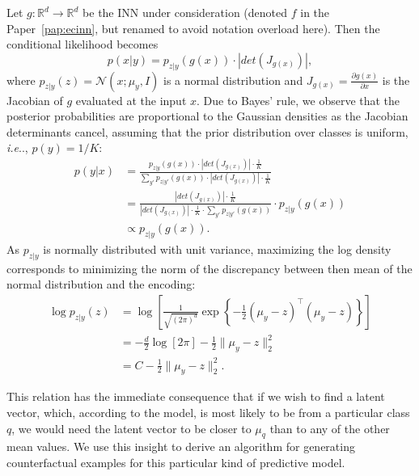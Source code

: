 \documentclass[11pt,a4paper,twoside,openright,final]{memoir}
\makeatletter
\DeclareRobustCommand\onedot{\futurelet\@let@token\@onedot}
\def\@onedot{\ifx\@let@token.\else.\null\fi\xspace}
\def\ie{\emph{i.e}\onedot} \def\Ie{\emph{I.e}\onedot}
\newcommand*{\paperref}[1]{Paper~\hyperref[#1]{\ref{#1}}}
\makeatother
\begin{document}
Let $g: \mathbb{R}^{d} \rightarrow \mathbb{R}^{d}$ be the INN under consideration (denoted $f$ in the \paperref{pap:ecinn}, but renamed to avoid notation overload here).
Then the conditional likelihood becomes
\begin{equation}\label{eq:conditional-likelihood}
    p(x | y) = p_{z|y}(g(x)) \cdot \left| det\left( J_{g(x)} \right)\right|,
\end{equation}
where $p_{z|y}(z) = \mathcal{N}(x; \mu_y, I)$ is a normal distribution and $J_{g(x)}=\frac{\partial g(x)}{\partial x}$ is the Jacobian of $g$ evaluated at the input $x$. 
Due to  Bayes' rule, we observe that the posterior probabilities are proportional to the Gaussian densities as the Jacobian determinants cancel, assuming that the prior distribution over classes is uniform, \ie, $p(y) = 1/K$: 
\begin{align}\label{eq:proportional} 
    p(y | x) &= \frac{p_{z|y}( g(x) ) \cdot \left| det\left( J_{g(x)} \right)\right| \cdot \frac{1}{K}}{\sum_{y'} p_{z|y'}( g(x) ) \cdot \left| det \left(  J_{g(x)} \right) \right| \cdot \frac{1}{K}}\\
    &= \frac{\left| det \left( J_{g(x)} \right) \right| \cdot \frac{1}{K}}{\left| det \left( J_{g(x)} \right) \right| \cdot \frac{1}{K} \cdot \sum_{y'} p_{z|y'}( g(x) ) } \cdot p_{z|y}(g(x))\\
    &\propto p_{z|y}(g(x)).
\end{align}
As $p_{z|y}$ is normally distributed with unit variance, maximizing the log density corresponds to minimizing the norm of the discrepancy between then mean of the normal distribution and the encoding: 
\begin{align}\label{eq:log-gaussian}
    \log p_{z|y}(z) &= \log\left[ \frac{1}{\sqrt{(2\pi)^d }} \exp\left\{-\frac{1}{2}(\mu_y-z)^\intercal(\mu_y-z)\right\} \right] \\
    &= -\frac{d}{2}\log\left[2\pi\right] - \frac{1}{2}\|\mu_y-z\|_2^2\\
    &= C - \frac{1}{2}\|\mu_y - z\|_2^2.
\end{align}

This relation has the immediate consequence that if we wish to find a latent vector, which, according to the model, is most likely to be from a particular class $q$, we would need the latent vector to be closer to $\mu_q$ than to any of the other mean values. 
We use this insight to derive an algorithm for generating counterfactual examples for this particular kind of predictive model. 
\end{document}
